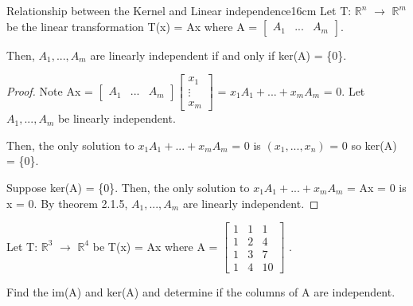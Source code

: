     \newpage



    \begin{wtheorem}{Relationship between the Kernel and Linear independence}{16cm}
        Let T: $\mathbb{R}^n$ $\rightarrow$ $\mathbb{R}^m$
        be the linear transformation T(x) = Ax where A =
        $\begin{bmatrix}
            A_1 & ... & A_m
        \end{bmatrix}$.

        Then, $A_1,...,A_m$ are linearly independent if and only if
        ker(A) = \{0\}.
    \end{wtheorem}

    \begin{proof}
        Note 
        Ax =
        \footnotesize
        $\begin{bmatrix}
            A_1 & ... & A_m
        \end{bmatrix}
        \begin{bmatrix}
            x_1 \\
            \vdots \\
            x_m
        \end{bmatrix}$
        \normalsize
        = $x_1A_1 + ... + x_mA_m$
        = 0.
        Let $A_1,...,A_m$ be linearly independent.

        Then, the only solution to $x_1A_1 + ... + x_mA_m$ = 0
        is $(x_1,...,x_n)$ = 0 so ker(A) = \{0\}.

        \vspace{0.2cm}

        Suppose ker(A) = \{0\}.
        Then, the only solution
        to $x_1A_1 + ... + x_mA_m$ = Ax = 0 is x = 0.
        By {\color{red} theorem 2.1.5},
        $A_1,...,A_m$ are linearly independent.
    \end{proof}

    \vspace{0.5cm}



    \begin{example}
        Let T: $\mathbb{R}^3$ $\rightarrow$ $\mathbb{R}^4$ be
        T(x) = Ax where A =
        \footnotesize
        $\begin{bmatrix}
            1 & 1 & 1 \\
            1 & 2 & 4 \\
            1 & 3 & 7 \\
            1 & 4 & 10
        \end{bmatrix}$
        \normalsize.

        Find the im(A) and ker(A) and determine if the
        columns of A are independent.
    \end{example}

